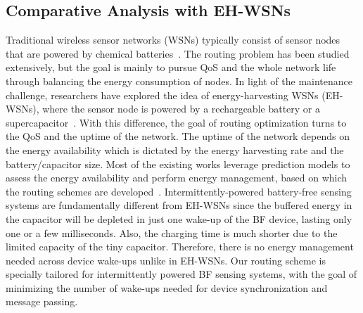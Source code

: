\documentclass[lettersize,journal]{IEEEtran}
\begin{document}
\subsection{Comparative Analysis with EH-WSNs}
Traditional wireless sensor networks (WSNs) typically consist of sensor nodes that are powered by chemical batteries~\cite{2020-algo-wsnsurvey}. The routing problem has been studied extensively, but the goal is mainly to pursue QoS and the whole network life through balancing the energy consumption of nodes. In light of the maintenance challenge, researchers have explored the idea of energy-harvesting WSNs (EH-WSNs), where the sensor node is powered by a rechargeable battery or a supercapacitor~\cite{2018-tosn-ehwsn}. With this difference, the goal of routing optimization turns to the QoS and the uptime of the network. The uptime of the network depends on the energy availability which is dictated by the energy harvesting rate and the battery/capacitor size. Most of the existing works leverage prediction models to assess the energy availability and perform energy management, based on which the routing schemes are developed~\cite{2018-tosn-ehwsn,2015-commag-ehwsn,2019-ipsn-ehs}. Intermittently-powered battery-free sensing systems are fundamentally different from EH-WSNs since the buffered energy in the capacitor will be depleted in just one wake-up of the BF device, lasting only one or a few milliseconds. Also, the charging time is much shorter due to the limited capacity of the tiny capacitor.
Therefore, there is no energy management needed across device wake-ups unlike in EH-WSNs. Our routing scheme is specially tailored for intermittently powered BF sensing systems, with the goal of minimizing the number of wake-ups needed for device synchronization and message passing.
\end{document}
